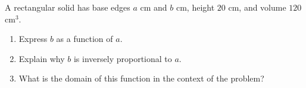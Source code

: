 A rectangular solid has base edges $a$ cm and $b$ cm, height $20$ cm, and volume $120$ cm$^3$.
\begin{enumerate}
\item[(a)] Express $b$ as a function of $a$.
\item[(b)] Explain why $b$ is inversely proportional to $a$.
\item[(c)] What is the domain of this function in the context of the problem?
\end{enumerate}
